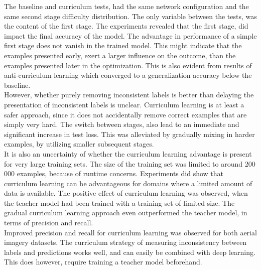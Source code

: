 The baseline and curriculum tests, had the same network configuration and the same second stage difficulty distribution. The only variable between the tests, was the content of the first stage. The experiments revealed that the first stage, did impact the final accuracy of the model. The advantage in performance of a simple first stage does not vanish in the trained model. This might indicate that the examples presented early, exert a larger influence on the outcome, than the examples presented later in the optimization. This is also evident from results of anti-curriculum learning which converged to a generalization accuracy below the baseline. \\

However, whether purely removing inconsistent labels is better than delaying the presentation of inconsistent labels is unclear. Curriculum learning is at least a safer approach, since it does not accidentally remove correct examples that are simply very hard. The switch between stages, also lead to an immediate and significant increase in test loss. This was alleviated by gradually mixing in harder examples, by utilizing smaller subsequent stages.\\

It is also an uncertainty of whether the curriculum learning advantage is present for very large training sets. The size of the training set was limited to around 200 000 examples, because of runtime concerns. Experiments did show that curriculum learning can be advantageous for domains where a limited amount of data is available. The positive effect of curriculum learning was observed, when the teacher model had been trained with a training set of limited size. The gradual curriculum learning approach even outperformed the teacher model, in terms of precision and recall.\\

Improved precision and recall for curriculum learning was observed for both aerial imagery datasets. The curriculum strategy of measuring inconsistency between labels and predictions works well, and can easily be combined with deep learning. This does however, require training a teacher model beforehand.


